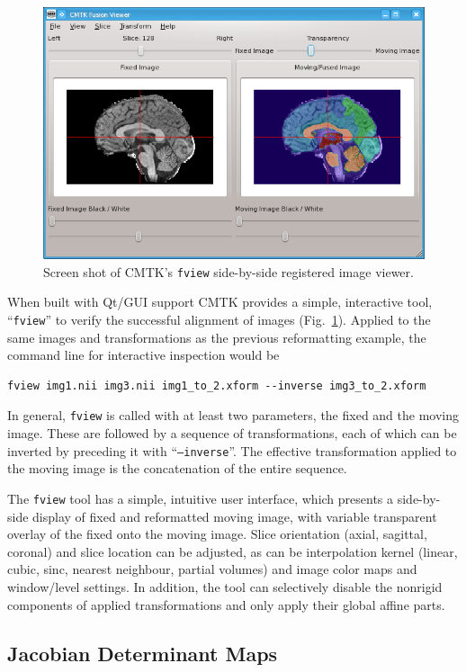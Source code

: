 \documentclass{InsightArticle}
\begin{document}
\begin{figure}[tbp]
\centerline{\includegraphics[width=.7\linewidth]{img/fview}}
\caption{Screen shot of CMTK's {\tt fview} side-by-side registered image
  viewer.}
\label{fig:fview}
\end{figure}

When built with Qt/GUI support CMTK provides a simple, interactive tool,
``{\tt fview}'' to verify the successful alignment of images
(Fig.~\ref{fig:fview}). Applied to the same images and transformations as the
previous reformatting example, the command line for interactive inspection
would be
\begin{verbatim}
fview img1.nii img3.nii img1_to_2.xform --inverse img3_to_2.xform
\end{verbatim}
In general, {\tt fview} is called with at least two parameters, the fixed and
the moving image. These are followed by a sequence of transformations, each of
which can be inverted by preceding it with ``{\tt --inverse}''. The effective
transformation applied to the moving image is the concatenation of the entire
sequence.

The {\tt fview} tool has a simple, intuitive user interface, which presents a
side-by-side display of fixed and reformatted moving image, with variable
transparent overlay of the fixed onto the moving image. Slice orientation
(axial, sagittal, coronal) and slice location can be adjusted, as can be
interpolation kernel (linear, cubic, sinc, nearest neighbour, partial
volumes) and image color maps and window/level settings. In addition, the tool
can selectively disable the nonrigid components of applied transformations and
only apply their global affine parts.

\subsection{Jacobian Determinant Maps}
\end{document}

